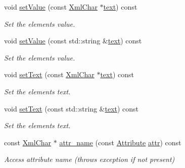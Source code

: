 \begin{DoxyCompactItemize}
void \hyperlink{class_d_d4hep_1_1_x_m_l_1_1_handle__t_a93135135a8503cb47ba4ede43c7dab59}{set\+Value} (const \hyperlink{namespace_d_d4hep_1_1_x_m_l_a09e5d9cc86ed782f6826dfe0778c1815}{Xml\+Char} $\ast$\hyperlink{class_d_d4hep_1_1_x_m_l_1_1_handle__t_aea331b719cb6948a414f4cd1040fc2a5}{text}) const
\begin{DoxyCompactList}\small\item\em Set the element\textquotesingle{}s value. \end{DoxyCompactList}\item 
void \hyperlink{class_d_d4hep_1_1_x_m_l_1_1_handle__t_aa9201b6385b1d1be3080fe2d529ec6f7}{set\+Value} (const std\+::string \&\hyperlink{class_d_d4hep_1_1_x_m_l_1_1_handle__t_aea331b719cb6948a414f4cd1040fc2a5}{text}) const
\begin{DoxyCompactList}\small\item\em Set the element\textquotesingle{}s value. \end{DoxyCompactList}\item 
void \hyperlink{class_d_d4hep_1_1_x_m_l_1_1_handle__t_abe16e6995181e0e0fc847f46cf760d7c}{set\+Text} (const \hyperlink{namespace_d_d4hep_1_1_x_m_l_a09e5d9cc86ed782f6826dfe0778c1815}{Xml\+Char} $\ast$\hyperlink{class_d_d4hep_1_1_x_m_l_1_1_handle__t_aea331b719cb6948a414f4cd1040fc2a5}{text}) const
\begin{DoxyCompactList}\small\item\em Set the element\textquotesingle{}s text. \end{DoxyCompactList}\item 
void \hyperlink{class_d_d4hep_1_1_x_m_l_1_1_handle__t_a53612b8b4780ef110da05787bad5b33d}{set\+Text} (const std\+::string \&\hyperlink{class_d_d4hep_1_1_x_m_l_1_1_handle__t_aea331b719cb6948a414f4cd1040fc2a5}{text}) const
\begin{DoxyCompactList}\small\item\em Set the element\textquotesingle{}s text. \end{DoxyCompactList}\item 
const \hyperlink{namespace_d_d4hep_1_1_x_m_l_a09e5d9cc86ed782f6826dfe0778c1815}{Xml\+Char} $\ast$ \hyperlink{class_d_d4hep_1_1_x_m_l_1_1_handle__t_a39c297fc946cd4a93a1c750030b7edd8}{attr\+\_\+name} (const \hyperlink{namespace_d_d4hep_1_1_x_m_l_a5c19b7116be99d69b4b22d911357baaf}{Attribute} \hyperlink{class_d_d4hep_1_1_x_m_l_1_1_handle__t_a5b116e138ee498803385f9ec503395c3}{attr}) const
\begin{DoxyCompactList}\small\item\em Access attribute name (throws exception if not present) \end{DoxyCompactList}\item 

\end{DoxyCompactItemize}
